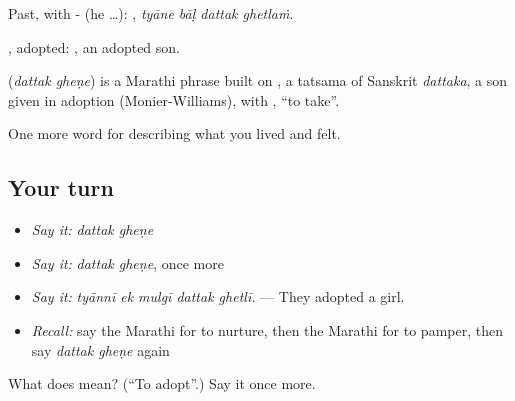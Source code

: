 Past, with - (he …):    , \emph{tyāne bāḷ dattak ghetlaṁ}.

, adopted:  , an adopted son.

\begin{cousinweb}
\textbf{ } (\emph{dattak gheṇe}) is a Marathi phrase built on , a tatsama of Sanskrit \emph{dattaka}, a son given in adoption (Monier-Williams), with , \textquotedblleft{}to take\textquotedblright{}.
\end{cousinweb}

\begin{grammarlens}[title={What you've built}]
One more word for describing what you lived and felt.
\end{grammarlens}

\subsection*{Your turn}
\begin{itemize}
\raggedright
  \item \emph{Say it:} \emph{dattak gheṇe}
  \item \emph{Say it:} \emph{dattak gheṇe}, once more
  \item \emph{Say it:} \emph{tyānnī ek mulgī dattak ghetlī.} — They adopted a girl.
  \item \emph{Recall:} say the Marathi for to nurture, then the Marathi for to pamper, then say \emph{dattak gheṇe} again
\end{itemize}

\begin{tcolorbox}[breakable,colback=teal!4,colframe=teal!35!black,title={Before you move on}]
What does   mean? (\textquotedblleft{}To adopt\textquotedblright{}.) Say it once more.
\end{tcolorbox}
